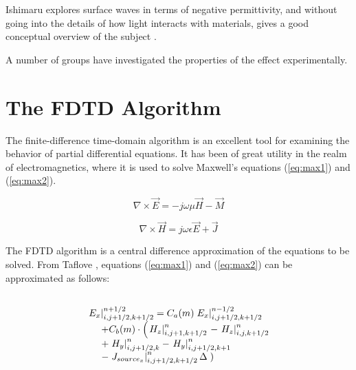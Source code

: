\documentclass{acesconference}
\begin{document}
Ishimaru explores surface waves in terms of negative permittivity,
and without going into the details of how light interacts with
materials, gives a good conceptual overview of the subject
\cite{ishimaru91}.  

A number of groups have investigated the properties of the effect
experimentally. 


\section{The FDTD Algorithm} 
The finite-difference time-domain algorithm \cite{yee1966} is an
excellent tool for examining the behavior of partial differential
equations. It has been of great utility in the realm of
electromagnetics, where it is used to solve Maxwell's equations
(\ref{eq:max1}) and (\ref{eq:max2}). 

\begin{equation}
  \label{eq:max1}
  \nabla \times \vec{E} = -j \omega \mu \vec{H} - \vec{M}
\end{equation}

\begin{equation}
  \label{eq:max2}
  \nabla \times \vec{H} = j \omega \epsilon \vec{E} + \vec{J}
\end{equation}

The FDTD algorithm is a central difference approximation of the
equations to be solved. From Taflove \cite{taflove????}, equations
(\ref{eq:max1}) and (\ref{eq:max2}) can be approximated as follows:

\begin{equation}
  \label{eq:approxEx}
  \begin{array}{ll}
    \hspace{0.15cm} & \\
    \multicolumn{2}{l}{\left.  E_x \right|^{n+1/2}_{i,j+1/2,k+1/2}
     = C_a(m) \left. E_x \right|^{n-1/2}_{i,j+1/2,k+1/2}} \\
    & + C_b(m) \cdot \left( \left. H_z \right|^{n}_{i,j+1,k+1/2} \right.
      - \left. H_z \right|^{n}_{i,j,k+1/2} \\
    & + \left. H_y \right|^{n}_{i,j+1/2,k} 
     - \left. H_y \right|^{n}_{i,j+1/2,k+1} \\
    & - \left. J_{source_x} \right|^{n}_{i,j+1/2,k+1/2} \Delta \left. \right) 
  \end{array}
\end{equation}
\end{document}
